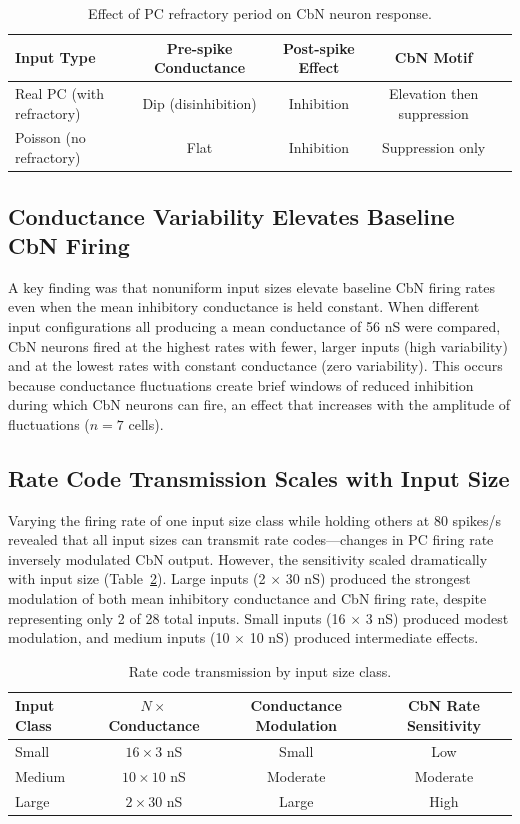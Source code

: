 \documentclass[12pt]{article}
\begin{document}
\begin{table}[htbp]
\centering
\caption{Effect of PC refractory period on CbN neuron response.}
\label{tab:refractory}
\begin{tabular}{lcccc}
\toprule
Input Type & Pre-spike Conductance & Post-spike Effect & CbN Motif \\
\midrule
Real PC (with refractory) & Dip (disinhibition) & Inhibition & Elevation then suppression \\
Poisson (no refractory) & Flat & Inhibition & Suppression only \\
\bottomrule
\end{tabular}
\end{table}

\subsection{Conductance Variability Elevates Baseline CbN Firing}

A key finding was that nonuniform input sizes elevate baseline CbN firing rates even when the mean inhibitory conductance is held constant. When different input configurations all producing a mean conductance of 56 nS were compared, CbN neurons fired at the highest rates with fewer, larger inputs (high variability) and at the lowest rates with constant conductance (zero variability). This occurs because conductance fluctuations create brief windows of reduced inhibition during which CbN neurons can fire, an effect that increases with the amplitude of fluctuations ($n = 7$ cells).

\subsection{Rate Code Transmission Scales with Input Size}

Varying the firing rate of one input size class while holding others at 80 spikes/s revealed that all input sizes can transmit rate codes---changes in PC firing rate inversely modulated CbN output. However, the sensitivity scaled dramatically with input size (Table~\ref{tab:rate}). Large inputs (2 $\times$ 30 nS) produced the strongest modulation of both mean inhibitory conductance and CbN firing rate, despite representing only 2 of 28 total inputs. Small inputs (16 $\times$ 3 nS) produced modest modulation, and medium inputs (10 $\times$ 10 nS) produced intermediate effects.

\begin{table}[htbp]
\centering
\caption{Rate code transmission by input size class.}
\label{tab:rate}
\begin{tabular}{lccc}
\toprule
Input Class & $N \times$ Conductance & Conductance Modulation & CbN Rate Sensitivity \\
\midrule
Small & $16 \times 3$ nS & Small & Low \\
Medium & $10 \times 10$ nS & Moderate & Moderate \\
Large & $2 \times 30$ nS & Large & High \\
\bottomrule
\end{tabular}
\end{table}
\end{document}
